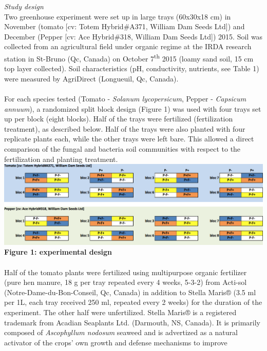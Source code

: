 \documentclass[11pt,]{article}
\begin{document}
\emph{Study design}\\
Two greenhouse experiment were set up in large trays (60x30x18 cm) in
November (tomato {[}cv: Totem Hybrid\#A371, William Dam Seeds Ltd{]})
and December (Pepper {[}cv: Ace Hybrid\#318, William Dam Seeds Ltd{]})
2015. Soil was collected from an agricultural field under organic regime
at the IRDA research station in St-Bruno (Qc, Canada) on October
7\textsuperscript{th} 2015 (loamy sand soil, 15 cm top layer collected).
Soil characteristics (pH, conductivity, nutrients, see Table 1) were
measured by AgriDirect (Longueuil, Qc, Canada).\\
\hspace*{0.333em}\\
For each species tested (Tomato - \emph{Solanum lycopersicum}, Pepper -
\emph{Capsicum annuum}), a randomized split block design (Figure 1) was
used with four trays set up per block (eight blocks). Half of the trays
were fertilized (fertilization treatment), as described below. Half of
the trays were also planted with four replicate plants each, while the
other trays were left bare. This allowed a direct comparison of the
fungal and bacteria soil communities with respect to the fertilization
and planting treatment. ~\\
\includegraphics[width=6.25000in]{../figures/Figure1.png}\\
\textbf{Figure 1: experimental design}\\
\hspace*{0.333em}\\
Half of the tomato plants were fertilized using multipurpose organic
fertilizer (pure hen manure, 18 g per tray repeated every 4 weeks,
5-3-2) from Acti-sol (Notre-Dame-du-Bon-Conseil, Qc, Canada) in addition
to Stella Maris® (3.5 ml per 1L, each tray received 250 ml, repeated
every 2 weeks) for the duration of the experiment. The other half were
unfertilized. Stella Maris® is a registered trademark from Acadian
Seaplants Ltd. (Darmouth, NS, Canada). It is primarily composed of
\emph{Ascophyllum nodosum} seaweed and is advertized as a natural
activator of the crops' own growth and defense mechanisms to improve
\end{document}
